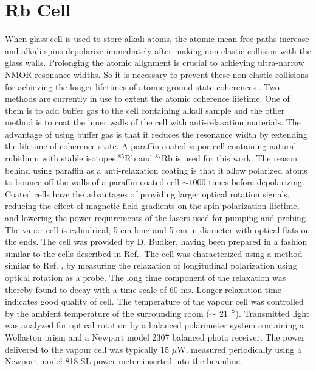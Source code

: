 \section{Rb Cell}
When glass cell is used to store alkali atoms, the atomic mean free paths increase and alkali spins depolarize immediately after making non-elastic collision with the glass walls. Prolonging the atomic alignment is crucial to achieving ultra-narrow NMOR resonance widths. So it is necessary to prevent these non-elastic collisions for achieving the longer lifetimes of atomic ground state coherences \cite{PhysRevA.72.023401}\cite{Balabas:10}  \cite{doi:10.1063/1.3236649}. Two methods are currently in use to extent the atomic coherence lifetime. One of them is to add buffer gas to the cell containing alkali sample and the other method is to coat the inner walls of the cell with anti-relaxation materials. The advantage of using buffer gas is that it reduces the resonance width by extending the lifetime of coherence state. A paraffin-coated vapor cell containing  natural rubidium with stable isotopes $^{85}$Rb and $^{87}$Rb is used for this work. The reason behind using paraffin as a anti-relaxation coating is that it allow polarized atoms to bounce off the walls of a paraffin-coated cell $\sim 1000$ times before depolarizing\cite{PhysRev.147.41}\cite{PhysRevA.72.023401}. Coated cells have the advantages of providing larger optical rotation
signals, reducing the effect of magnetic field gradients on the spin polarization lifetime,
and lowering the power requirements of the lasers used for pumping and probing. The vapor cell is cylindrical, 5 cm long and 5 cm in diameter with optical
flats on the ends. The cell was provided by D. Budker, having been prepared in
a fashion similar to the cells described in Ref.\cite{PhysRevA.72.023401}. The cell was characterized
using a method similar to Ref. \cite{PhysRevA.72.023401}, by measuring the relaxation of longitudinal
polarization using optical rotation as a probe. The long time component of the relaxation was thereby found to decay with a time scale of 60 ms.  Longer relaxation time indicates good quality of cell. The temperature of the vapour cell was controlled by the ambient temperature of the surrounding room (∼ 21 $\degree$). Transmitted light was analyzed for optical rotation by a balanced polarimeter system containing a Wollaston prism and a Newport model 2307 balanced photo receiver. The power delivered to the vapour cell was typically 15 $\mu$W, measured periodically using a Newport model 818-SL power meter inserted into the
beamline. 
